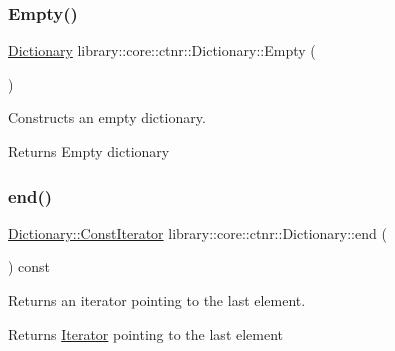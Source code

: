 \subsubsection{\texorpdfstring{Empty()}{Empty()}}
{\footnotesize\ttfamily \mbox{\hyperlink{classlibrary_1_1core_1_1ctnr_1_1_dictionary}{Dictionary}} library\+::core\+::ctnr\+::\+Dictionary\+::\+Empty (\begin{DoxyParamCaption}{ }\end{DoxyParamCaption})\hspace{0.3cm}{\ttfamily [static]}}



Constructs an empty dictionary. 


\begin{DoxyCode}{0}
\end{DoxyCode}


\begin{DoxyReturn}{Returns}
Empty dictionary 
\end{DoxyReturn}
\mbox{\label{classlibrary_1_1core_1_1ctnr_1_1_dictionary_ace2fb3bdb88a059090e8b0265d97e57e}} 
\subsubsection{\texorpdfstring{end()}{end()}\hspace{0.1cm}{\footnotesize\ttfamily [1/2]}}
{\footnotesize\ttfamily \mbox{\hyperlink{classlibrary_1_1core_1_1ctnr_1_1_dictionary_1_1_const_iterator}{Dictionary\+::\+Const\+Iterator}} library\+::core\+::ctnr\+::\+Dictionary\+::end (\begin{DoxyParamCaption}{ }\end{DoxyParamCaption}) const}



Returns an iterator pointing to the last element. 

\begin{DoxyReturn}{Returns}
\mbox{\hyperlink{classlibrary_1_1core_1_1ctnr_1_1_dictionary_1_1_iterator}{Iterator}} pointing to the last element 
\end{DoxyReturn}
\mbox{\label{classlibrary_1_1core_1_1ctnr_1_1_dictionary_a16ed18981bcf7ffdc7308801cc4b9d56}} 
